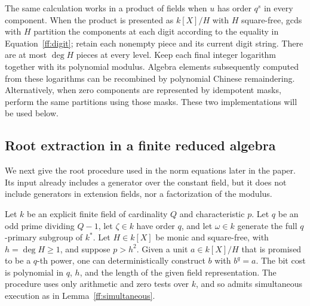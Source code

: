 The same calculation works in a product of fields when $u$ has order $q^s$
in every component.  When the product is presented as $k[X]/H$ with $H$
square-free, gcds with $H$ partition the components at each digit according
to the equality in Equation~\eqref{ff:digit}; retain each nonempty piece and
its current digit string.  There are at most $\deg H$ pieces at every level.
Keep each final integer logarithm together with its polynomial modulus.
Algebra elements subsequently computed from these logarithms can be recombined
by polynomial Chinese remaindering.  Alternatively, when zero components are represented by idempotent masks,
perform the same partitions using those masks.  These two implementations
will be used below.

\subsection{Root extraction in a finite reduced algebra}

We next give the root procedure used in the norm equations later in the paper.
Its input already includes a generator over the constant field, but it does
not include generators in extension fields, nor a factorization of the
modulus.

\begin{lemma}
\label{ff:unitroot}
Let $k$ be an explicit finite field of cardinality $Q$ and characteristic $p$.
Let $q$ be an odd prime dividing $Q-1$, let $\zeta\in k$ have order $q$, and
let $\omega\in k$ generate the full $q$-primary subgroup of $k^*$.
Let $H\in k[X]$ be monic and square-free, with $h=\deg H\ge1$, and suppose
$p>h^2$.  Given a unit $a\in k[X]/H$ that is promised to be a $q$-th power,
one can deterministically construct $b$ with $b^q=a$.
The bit cost is polynomial in $q$, $h$, and the length of the given field
representation.  The procedure uses only arithmetic and zero tests over $k$,
and so admits simultaneous execution as in Lemma~\ref{ff:simultaneous}.
\end{lemma}

